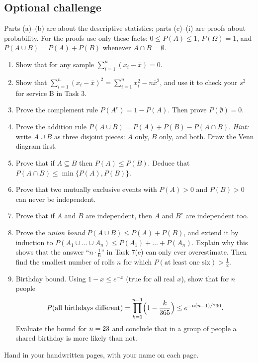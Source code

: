\subsection*{Optional challenge}
Parts (a)--(b) are about the descriptive statistics; parts (c)--(i) are proofs about probability. For the proofs use
only these facts: $0 \le P(A) \le 1$, $P(\Omega) = 1$, and $P(A \cup B) = P(A) + P(B)$ whenever $A \cap B = \emptyset$.
\begin{enumerate}[label=(\alph*)]
  \item Show that for any sample $\sum_{i=1}^{n}(x_i - \bar{x}) = 0$.
  \item Show that $\sum_{i=1}^{n}(x_i - \bar{x})^2 = \sum_{i=1}^{n} x_i^2 - n\bar{x}^2$, and use it to check your $s^2$ for
        service B in Task 3.
  \item Prove the complement rule $P(A^c) = 1 - P(A)$. Then prove $P(\emptyset) = 0$.
  \item Prove the addition rule $P(A \cup B) = P(A) + P(B) - P(A \cap B)$. \emph{Hint:} write $A \cup B$ as three
        disjoint pieces: $A$ only, $B$ only, and both. Draw the Venn diagram first.
  \item Prove that if $A \subseteq B$ then $P(A) \le P(B)$. Deduce that $P(A \cap B) \le \min\{P(A), P(B)\}$.
  \item Prove that two mutually exclusive events with $P(A) > 0$ and $P(B) > 0$ can never be independent.
  \item Prove that if $A$ and $B$ are independent, then $A$ and $B^c$ are independent too.
  \item Prove the \emph{union bound} $P(A \cup B) \le P(A) + P(B)$, and extend it by induction to
        $P(A_1 \cup \dots \cup A_n) \le P(A_1) + \dots + P(A_n)$. Explain why this shows that the answer
        ``$n \cdot \frac16$'' in Task 7(e) can only ever overestimate. Then find the smallest number of rolls $n$ for which
        $P(\text{at least one six}) > \frac12$.
  \item Birthday bound. Using $1 - x \le e^{-x}$ (true for all real $x$), show that for $n$ people
        \[ P(\text{all birthdays different}) = \prod_{k=1}^{n-1}\Bigl(1 - \frac{k}{365}\Bigr) \le e^{-n(n-1)/730}. \]
        Evaluate the bound for $n = 23$ and conclude that in a group of \hwBdayBoundN{} people a shared
        birthday is more likely than not.
\end{enumerate}

\medskip
\noindent Hand in your handwritten pages, with your name on each page.
